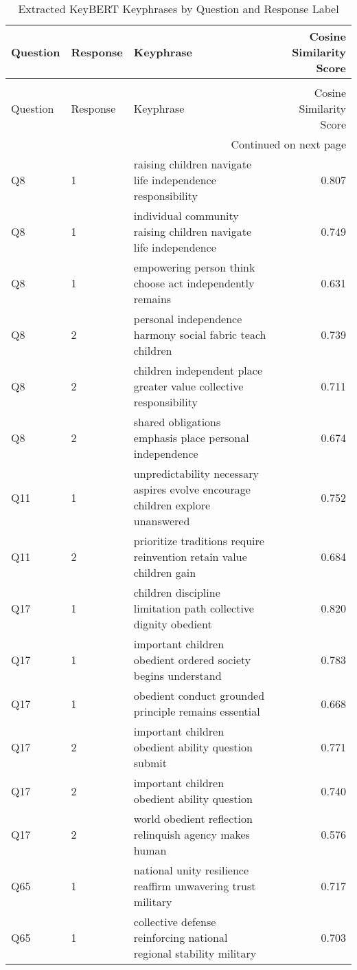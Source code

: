 \begin{longtable}{lllr}
\caption{Extracted KeyBERT Keyphrases by Question and Response Label} \label{tab:keybert_keyphrases} \\
\toprule
Question & Response & Keyphrase & Cosine Similarity Score \\
\midrule
\endfirsthead
\caption[]{Extracted KeyBERT Keyphrases by Question and Response Label} \\
\toprule
Question & Response & Keyphrase & Cosine Similarity Score \\
\midrule
\endhead
\midrule
\multicolumn{4}{r}{Continued on next page} \\
\midrule
\endfoot
\bottomrule
\endlastfoot
Q8 & 1 & raising children navigate life independence responsibility & 0.807 \\
Q8 & 1 & individual community raising children navigate life independence & 0.749 \\
Q8 & 1 & empowering person think choose act independently remains & 0.631 \\
Q8 & 2 & personal independence harmony social fabric teach children & 0.739 \\
Q8 & 2 & children independent place greater value collective responsibility & 0.711 \\
Q8 & 2 & shared obligations emphasis place personal independence & 0.674 \\
Q11 & 1 & unpredictability necessary aspires evolve encourage children explore unanswered & 0.752 \\
Q11 & 2 & prioritize traditions require reinvention retain value children gain & 0.684 \\
Q17 & 1 & children discipline limitation path collective dignity obedient & 0.820 \\
Q17 & 1 & important children obedient ordered society begins understand & 0.783 \\
Q17 & 1 & obedient conduct grounded principle remains essential & 0.668 \\
Q17 & 2 & important children obedient ability question submit & 0.771 \\
Q17 & 2 & important children obedient ability question & 0.740 \\
Q17 & 2 & world obedient reflection relinquish agency makes human & 0.576 \\
Q65 & 1 & national unity resilience reaffirm unwavering trust military & 0.717 \\
Q65 & 1 & collective defense reinforcing national regional stability military & 0.703 \\

\end{longtable}
